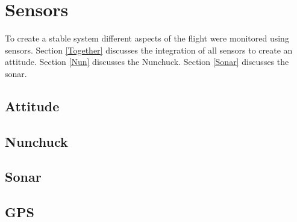 \section{Sensors}
To create a stable system different aspects of the flight were monitored using sensors. Section \ref{Together} discusses the integration of all sensors to create an attitude. Section \ref{Nun} discusses the Nunchuck. Section \ref{Sonar} discusses the sonar. 


\subsection{Attitude \label{Together}}
\subsection{Nunchuck\label{Nun}}
\subsection{Sonar\label{Sonar}}
\subsection{GPS}
\subsection{}

